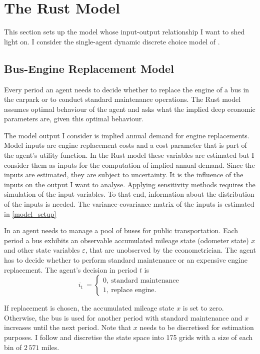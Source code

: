 \section{The Rust Model} \label{rust_model}

This section sets up the model whose input-output relationship I want to shed light on. I consider the single-agent dynamic discrete choice model of \citet{R87}.

\subsection{Bus-Engine Replacement Model}

Every period an agent needs to decide whether to replace the engine of a bus in the carpark or to conduct standard maintenance operations. The Rust model assumes optimal behaviour of the agent and asks what the implied deep economic parameters are, given this optimal behaviour.

The model output I consider is implied annual demand for engine replacements. Model inputs are engine replacement costs and a cost parameter that is part of the agent’s utility function. In the Rust model these variables are estimated but I consider them as inputs for the computation of implied annual demand. Since the inputs are estimated, they are subject to uncertainty. It is the influence of the inputs on the output I want to analyse. Applying sensitivity methods requires the simulation of the input variables. To that end, information about the distribution of the inputs is needed. The variance-covariance matrix of the inputs is estimated in \cref{model_setup} %

In \citet{R87} an agent needs to manage a pool of buses for public transportation. Each period a bus exhibits an observable accumulated mileage state (odometer state) $x$ and other state variables $\varepsilon$, that are unobserved by the econometrician. The agent has to decide whether to perform standard maintenance or an expensive engine replacement. The agent’s decision in period $t$ is
\begin{equation*}
i_t\ =
\begin{cases}
0,\ \text{standard maintenance} \\
1,\ \text{replace engine}.
\end{cases}
\end{equation*}

\noindent If replacement is chosen, the accumulated mileage state $x$ is set to zero. Otherwise, the bus is used for another period with standard maintenance and $x$ increases until the next period. Note that $x$ needs to be discretised for estimation purposes. I follow \citet{R87} and discretise the state space into 175 grids with a size of each bin of $2\,571$ miles.

